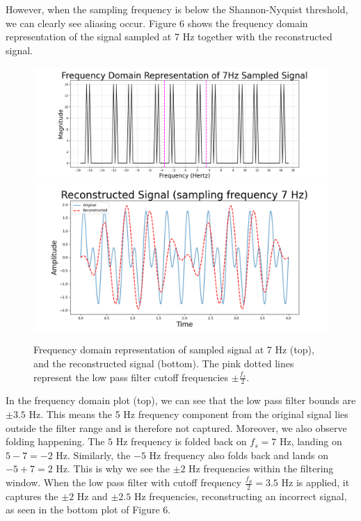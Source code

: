 \documentclass{article}
\begin{document}
However, when the sampling frequency is below the Shannon-Nyquist threshold, we can clearly see aliasing occur.
Figure 6 shows the frequency domain representation of the signal sampled at 7 Hz together with the reconstructed signal.

\begin{figure}[H]
    \centering
    \begin{minipage}{\textwidth}
        \centering
        \includegraphics[width=\linewidth]{images/pink_freqdom_7hz.png}
        \includegraphics[width=\linewidth]{images/ogcolors_reconstructed_7hz.png}
        \\[0.5em] 
    \end{minipage}
    \caption{Frequency domain representation of sampled signal at 7 Hz (top), and the reconstructed signal (bottom). 
    The pink dotted lines represent the low pass filter cutoff frequencies $\pm \frac{f_s}{2}$.}
\end{figure}

In the frequency domain plot (top), we can see that the low pass filter bounds are $\pm 3.5$ Hz.
This means the 5 Hz frequency component from the original signal lies outside the filter range and is therefore not captured.
Moreover, we also observe folding happening. The $5$ Hz frequency is folded back on $f_s = 7$ Hz, landing on $5-7=-2$ Hz. 
Similarly, the $-5$ Hz frequency also folds back and lands on $-5+7=2$ Hz. This is why we see the $\pm 2$ Hz frequencies within the filtering window.
When the low pass filter with cutoff frequency $\frac{f_S}{2} = 3.5$ Hz is applied, it captures the $\pm 2$ Hz and $\pm 2.5$ Hz frequencies, reconstructing an incorrect signal, as seen in the bottom plot of Figure 6.
\end{document}
